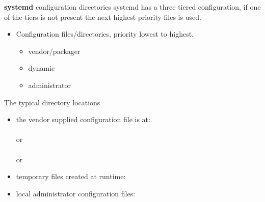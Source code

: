 \cprotect\note{

}

\begin{frame}
	{\textbf{systemd} configuration directories}
	systemd has a three tiered configuration, if one of the 
	tiers is not present the next highest priority files is 
	used. 
  	\begin{itemize} 
        \item Configuration files/directories, priority lowest to highest.
                \begin{itemize}
                \item vendor/packager
                \item dynamic
                \item administrator
                \end{itemize}
        \end{itemize}

\end{frame}

\cprotect\note{

}

\begin{frame}
	{The typical directory locations} 
	\begin{itemize}
	\item the vendor supplied configuration file is at: \\
		  \\
			or \\
		 \\
			or \\

	\item temporary files created at runtime:  \\

	\item local administrator configuration files:  \\
	\end{itemize}
\end{frame}

\cprotect\note{ 

} 

